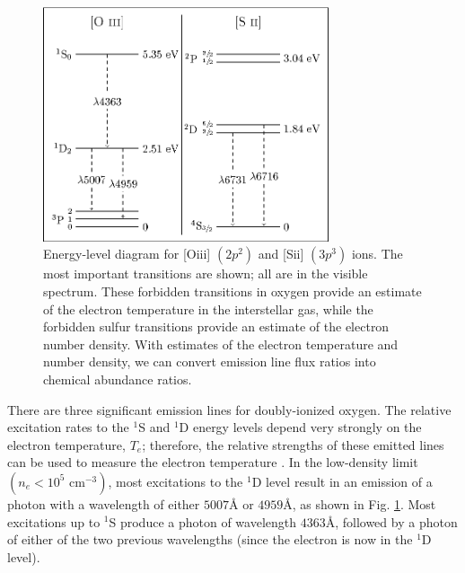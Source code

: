 \begin{figure}
	\centering
    \includegraphics[width=0.75\textwidth]{Images/Paper1/energy_level_diagram-figure0}
	\caption[{[] and [] energy-level diagram}]{Energy-level 
	diagram for [O{\sc iii}] $(2p^2)$ and [S{\sc ii}] $(3p^3)$ ions.  The most 
	important transitions are shown; all are in the visible spectrum.  These 
	forbidden transitions in oxygen provide an estimate of the electron temperature 
	in the interstellar gas, while the forbidden sulfur transitions provide an 
	estimate of the electron number density.  With estimates of the electron 
	temperature and number density, we can convert emission line flux ratios into 
	chemical abundance ratios.}
	\label{fig:transitions_P1}
\end{figure}

There are three significant emission lines for doubly-ionized oxygen.  The 
relative excitation rates to the $^1$S and $^1$D energy levels depend very 
strongly on the electron temperature, $T_e$; therefore, the relative strengths 
of these emitted lines can be used to measure the electron temperature 
\citep{Osterbrock89}.  In the low-density limit $(n_e < 10^5 \text{ cm}^{-3})$, 
most excitations to the $^1$D level result in an emission of a photon with a 
wavelength of either $5007\text{\AA}$ or $4959\text{\AA}$, as shown in Fig. 
\ref{fig:transitions_P1}.  Most excitations up to $^1$S produce a photon of 
wavelength $4363\text{\AA}$, followed by a photon of either of the two previous 
wavelengths (since the electron is now in the $^1$D level).

